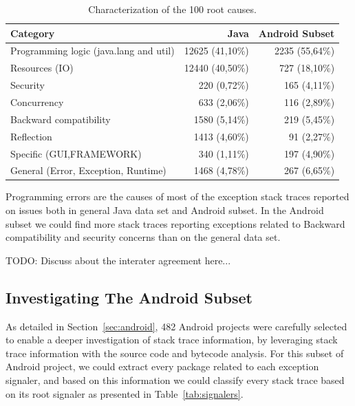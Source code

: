 \documentclass[conference]{IEEEtran}
\begin{document}
\begin{table}
  \centering
  \begin{tabular}{lrr}
    \hline
    \bfseries{Category} & \bfseries{Java} & \bfseries{Android Subset} \\
    \hline
      Programming logic (java.lang and util) & 12625  (41,10\%) & 2235 (55,64\%)\\
      Resources (IO)                         & 12440 (40,50\%)  & 727 (18,10\%) \\
      Security                               & 220  (0,72\%)    & 165 (4,11\%)\\
      Concurrency                            & 633 (2,06\%)     & 116  (2,89\%)\\
      Backward compatibility                 & 1580 (5,14\%)    & 219 (5,45\%) \\
      Reflection                             & 1413 (4,60\%)    & 91 (2,27\%)\\
      Specific (GUI,FRAMEWORK)               & 340 (1,11\%)     & 197 (4,90\%)\\
      General (Error, Exception, Runtime)    & 1468 (4,78\%)    & 267 (6,65\%)\\
    \hline
  \end{tabular}
  \caption{Characterization of the 100 root causes.}
  \label{tab:tophundrend}
\end{table}

Programming errors are the causes of most of the exception stack traces reported
on issues both in  general Java data set and Android subset. In the Android subset we could find 
more stack traces reporting exceptions related to Backward
compatibility and security concerns than on the general data set.


TODO: Discuss about the interater agreement here...

\subsection{Investigating The Android Subset}

As detailed in Section~\ref{sec:android}, 482 Android projects were carefully
selected to enable a deeper investigation of stack trace information, by
leveraging stack trace information with the source code and bytecode analysis.
For this subset of Android project, we could extract every package related to
each exception signaler, and based on this information we could classify every
stack trace based on its root signaler as presented in Table~\ref{tab:signalers}.
\end{document}

